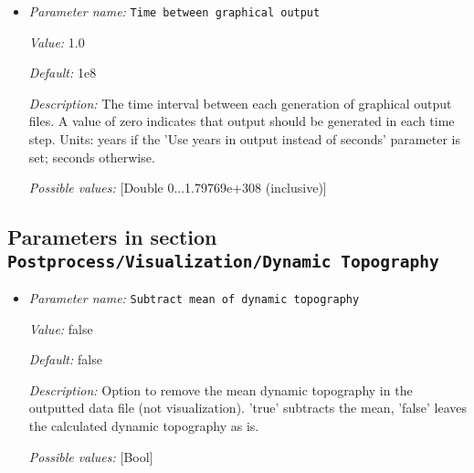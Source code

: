 \begin{itemize}
{\it Value:} vtu


{\it Default:} vtu


{\it Description:} The file format to be used for graphical output.


{\it Possible values:} [Selection none|dx|ucd|gnuplot|povray|eps|gmv|tecplot|tecplot_binary|vtk|vtu|hdf5|svg|deal.II intermediate ]
\item {\it Parameter name:} {\tt Time between graphical output}
\label{parameters:Postprocess/Visualization/Time between graphical output}


{\it Value:} 1.0


{\it Default:} 1e8


{\it Description:} The time interval between each generation of graphical output files. A value of zero indicates that output should be generated in each time step. Units: years if the 'Use years in output instead of seconds' parameter is set; seconds otherwise.


{\it Possible values:} [Double 0...1.79769e+308 (inclusive)]
\end{itemize}



\subsection{Parameters in section \tt Postprocess/Visualization/Dynamic Topography}
\label{parameters:Postprocess/Visualization/Dynamic_20Topography}

\begin{itemize}
\item {\it Parameter name:} {\tt Subtract mean of dynamic topography}
\label{parameters:Postprocess/Visualization/Dynamic Topography/Subtract mean of dynamic topography}


{\it Value:} false


{\it Default:} false


{\it Description:} Option to remove the mean dynamic topography in the outputted data file (not visualization). 'true' subtracts the mean, 'false' leaves the calculated dynamic topography as is. 


{\it Possible values:} [Bool]
\end{itemize}

